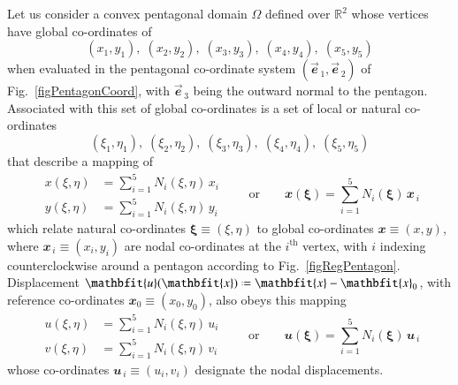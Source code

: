 Let us consider a convex pentagonal domain $\Omega$ defined over $\mathbb{R}^2$ whose vertices have global co-ordinates of
\begin{displaymath}
(x_1, y_1) , \; (x_2, y_2) , \; (x_3, y_3) , \; (x_4, y_4), \; (x_5, y_5)
\end{displaymath}
when evaluated in the pentagonal co-ordinate system $( \vec{\mathbfit{e}}_{\,1} , \vec{\mathbfit{e}}_{\,2} )$ of Fig.~\ref{figPentagonCoord}, with $\vec{\mathbfit{e}}_{\,3}$ being the outward normal to the pentagon.  Associated with this set of global co-ordinates is a set of local or natural co-ordinates
\begin{displaymath}
(\xi_1 , \eta_1) , \; (\xi_2 , \eta_2) , \; (\xi_3 , \eta_3) , \; (\xi_4 , \eta_4) , \; (\xi_5 , \eta_5)
\end{displaymath}
that describe a mapping of
\begin{equation}
\begin{aligned}
x(\xi, \eta) & = \sum\nolimits_{i=1}^5 N_i (\xi, \eta) \, x_i \\
y(\xi, \eta) & = \sum\nolimits_{i=1}^5 N_i (\xi, \eta) \, y_i
\end{aligned} 
\qquad \text{or} \qquad
\mathbfit{x}(\boldsymbol{\xi}) = \sum_{i=1}^5 N_i (\boldsymbol{\xi}) \, 
\mathbfit{x}_{\,i}
\end{equation}
which relate natural co-ordinates $\boldsymbol{\xi} \equiv (\xi, \eta)$ to global co-ordinates $\mathbfit{x} \equiv (x, y)$, where $\mathbfit{x}_{\,i} \equiv (x_i, y_i)$ are nodal co-ordinates at the $i^{\mathrm{th}}$ vertex, with $i$ indexing counterclockwise around a pentagon according to Fig.~\ref{figRegPentagon}.  Displacement $\mathbfit{u} (\mathbfit{x}) \defeq \mathbfit{x} - \mathbfit{x}_0$, with reference co-ordinates $\mathbfit{x}_0 \equiv (x_0, y_0)$, also obeys this mapping
\begin{equation}
\begin{aligned}
u(\xi, \eta) & = \sum\nolimits_{i=1}^5 N_i (\xi, \eta) \, u_i \\
v(\xi, \eta) & = \sum\nolimits_{i=1}^5 N_i (\xi, \eta) \, v_i
\end{aligned} 
\qquad \text{or} \qquad
\mathbfit{u}(\boldsymbol{\xi}) = \sum_{i=1}^5 N_i (\boldsymbol{\xi}) \, 
\mathbfit{u}_{\,i}
\end{equation}
whose co-ordinates $\mathbfit{u}_{\,i} \equiv (u_i , v_i)$ designate the nodal displacements.


